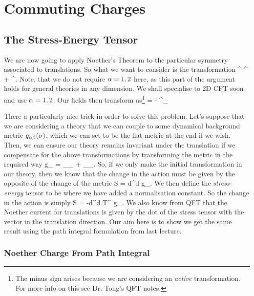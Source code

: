 \chapter{Commuting Charges}

\section{The Stress-Energy Tensor}

We are now going to apply Noether's Theorem to the particular symmetry associated to translations. So what we want to consider is the transformation
\bse 
    \sig^{\a} \to \sig^{\a} + \epsilon^{\a}.
\ese
Note, that we do not require $\alpha=1,2$ here, as this part of the argument holds for general theories in any dimension. We shall specialise to 2D CFT soon and use $\alpha=1,2$. Our fields then transform as\footnote{The minus sign arises because we are considering an \textit{active} transformation. For more info on this see Dr. Tong's QFT notes.} 
\bse 
    \del \phi = - \epsilon^{\a}\p_{\a} \phi
\ese

There a particularly nice trick in order to solve this problem. Let's suppose that we are considering a theory that we can couple to some dynamical background metric $g_{\alpha\beta}(\sigma)$, which we can set to be the flat metric at the end if we wish. Then, we can ensure our theory remains invariant under the translation if we compensate for the above transformations by transforming the metric in the required way
\bse 
    \del g_{\a\beta} = \nabla_{\a}\epsilon_{\beta} + \nabla_{\beta}\epsilon_{\a}.
\ese 
So, if we only make the initial transformation in our theory, then we know that the change in the action must be given by the opposite of the change of the metric
\bse 
    \del S = \int d^d\sig {} \del g_{\a\beta}.
\ese 
We then define the \textit{stress-energy} tensor to be 
where we have added a normalisation constant. So the change in the action is simply
\bse 
    \del S = -\int d^d\sig {} T^{\a\beta} \del g_{\a\beta}.
\ese 
We also know from QFT that the Noether current for translations is given by the dot of the stress tensor with the vector in the translation direction. Our aim here is to show we get the same result using the path integral formulation from last lecture. 

\subsection{Noether Charge From Path Integral}

